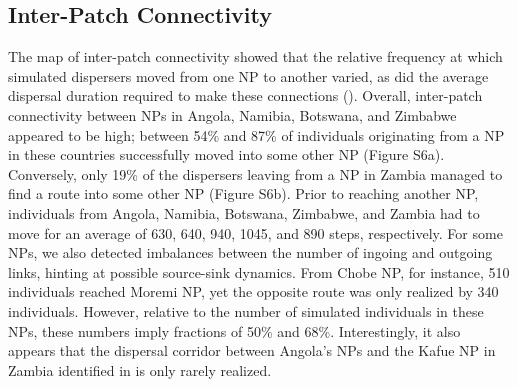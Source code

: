 \documentclass[abstract=on,10pt,a4paper,bibliography=totocnumbered]{article}
\begin{document}
\subsection{Inter-Patch Connectivity}
The map of inter-patch connectivity showed that the relative frequency at which
simulated dispersers moved from one NP to another varied, as did the average
dispersal duration required to make these connections
(). Overall, inter-patch connectivity between NPs
in Angola, Namibia, Botswana, and Zimbabwe appeared to be high; between 54\% and
87\% of individuals originating from a NP in these countries successfully moved
into some other NP (Figure S6a). Conversely, only 19\% of the dispersers leaving
from a NP in Zambia managed to find a route into some other NP (Figure S6b).
Prior to reaching another NP, individuals from Angola, Namibia, Botswana,
Zimbabwe, and Zambia had to move for an average of 630, 640, 940, 1045, and 890
steps, respectively. For some NPs, we also detected imbalances between the
number of ingoing and outgoing links, hinting at possible source-sink dynamics.
From Chobe NP, for instance, 510 individuals reached Moremi NP, yet the opposite
route was only realized by 340 individuals. However, relative to the number of
simulated individuals in these NPs, these numbers imply fractions of 50\% and
68\%. Interestingly, it also appears that the dispersal corridor between
Angola's NPs and the Kafue NP in Zambia identified in
 is only rarely realized.
\end{document}
